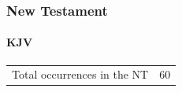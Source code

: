 				
			
		
		
	\subsubsection{New Testament} %
		\label{END-NT}
	
		\paragraph{KJV}
			\label{END-NT-KJV}
			
	
			\begin{tabular}{ll}
				Total occurrences in the NT & 60
			\end{tabular}
			
